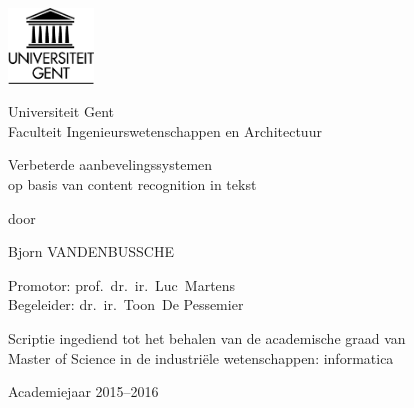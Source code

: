 

\begin{titlepage}

\setlength{\hoffset}{-1in}
\setlength{\voffset}{-1in}
\setlength{\topmargin}{1.5cm}
\setlength{\headheight}{0.5cm}
\setlength{\headsep}{1cm}
\setlength{\oddsidemargin}{3cm}
\setlength{\evensidemargin}{3cm}
\setlength{\footskip}{1.5cm}
\enlargethispage{1cm}

\fontsize{12pt}{14pt}
\selectfont

\begin{center}

\includegraphics[height=2cm]{fig/ruglogo}

\vspace{0.5cm}

Universiteit Gent\\
Faculteit Ingenieurswetenschappen en Architectuur\\

\vspace{4.5cm}

\fontsize{17.28pt}{21pt}
\selectfont

Verbeterde aanbevelingssystemen 
\\op basis van content recognition in tekst


\fontsize{12pt}{14pt}
\selectfont

\vspace{.6cm}

door 

\vspace{.4cm}

Bjorn VANDENBUSSCHE

\vspace{3.5cm}

Promotor: prof.~dr.~ir.~Luc~Martens\\
Begeleider: dr.~ir.~Toon~De Pessemier\\

\vspace{2cm}

Scriptie ingediend tot het behalen van de academische graad van\\ 
Master of Science in de industri\"ele wetenschappen: informatica

\vspace{1cm}

Academiejaar 2015--2016

\end{center}
\end{titlepage}
